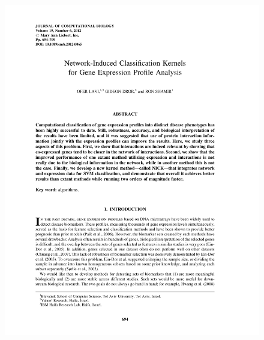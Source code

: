 \documentclass{beamer}
\begin{document}
\begin{frame}
\begin{figure}
\includegraphics[height=1\textheight]{NICK-page1}
\end{figure}
\end{frame}
\end{document}
